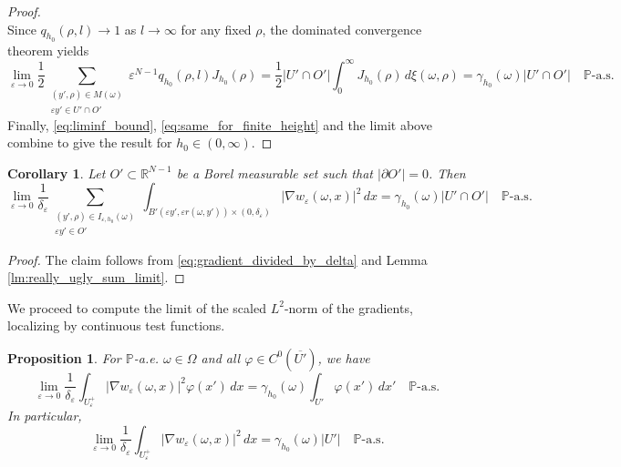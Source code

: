 \documentclass{article}
\numberwithin{equation}{section}
\newtheorem{proposition}[theorem]{Proposition}
\newtheorem{corollary}[theorem]{Corollary}
\theoremstyle{definition}
\theoremstyle{remark}
\begin{document}
\begin{proof}
\[    \]
    Since $q_{h_0}(\rho, l) \to 1$ as $l \to \infty$ for any fixed $\rho$, the dominated convergence theorem yields
    \[
    \lim_{\varepsilon \to 0} \frac{1}{2} \sum \limits_{\substack{(y', \rho) \in M(\omega) \\ \varepsilon y' \in U' \cap O'}} \varepsilon^{N - 1} q_{h_0}(\rho, l) J_{h_0}(\rho) = \frac{1}{2} |U' \cap O'| \int_0^\infty J_{h_0}(\rho) \, d\xi(\omega, \rho) = \gamma_{h_0}(\omega) |U' \cap O'| \quad \mathbb{P}\text{-a.s.}
    \]
    Finally, \eqref{eq:liminf_bound}, \eqref{eq:same_for_finite_height} and the limit above combine to give the result for $h_0 \in (0, \infty)$.
\end{proof}


\begin{corollary} \label{co:gradient_computation}
    Let $O' \subset \mathbb{R}^{N - 1}$ be a Borel measurable set such that $|\partial O'| = 0$. Then
    \[
    \lim_{\varepsilon \to 0} \frac{1}{\delta_\varepsilon} \sum \limits_{\substack{(y', \rho) \in I_{\varepsilon, h_0}(\omega) \\ \varepsilon y' \in O'}} \int_{B'(\varepsilon y', \varepsilon r(\omega, y')) \times (0, \delta_\varepsilon)} |\nabla w_\varepsilon(\omega, x)|^2 \, dx = \gamma_{h_0}(\omega) |U' \cap O'| \quad \mathbb{P}\text{-a.s.}
    \]
\end{corollary}

\begin{proof}
    The claim follows from \eqref{eq:gradient_divided_by_delta} and Lemma \ref{lm:really_ugly_sum_limit}.
\end{proof}

We proceed to compute the limit of the scaled $L^2$-norm of the gradients, localizing by continuous test functions.

\begin{proposition} \label{pr:local_gradient_limit}
    For $\mathbb{P}$-a.e. $\omega \in \Omega$ and all $\varphi \in C^0(\overline{U'})$, we have
    \begin{equation} \label{eq:local_gradient_limit}
        \lim_{\varepsilon \to 0} \frac{1}{\delta_\varepsilon} \int_{U_\varepsilon^+} |\nabla w_\varepsilon(\omega, x)|^2 \varphi(x') \, dx = \gamma_{h_0}(\omega) \int_{U'} \varphi(x') \, dx' \quad \mathbb{P}\text{-a.s.}
    \end{equation}
    In particular,
    \begin{equation} \label{eq:bounded_gradients}
        \lim_{\varepsilon \to 0} \frac{1}{\delta_\varepsilon} \int_{U_\varepsilon^+} |\nabla w_\varepsilon(\omega, x)|^2 \, dx = \gamma_{h_0}(\omega) |U'| \quad \mathbb{P}\text{-a.s.}
    \end{equation}
\end{proposition}
\end{document}
